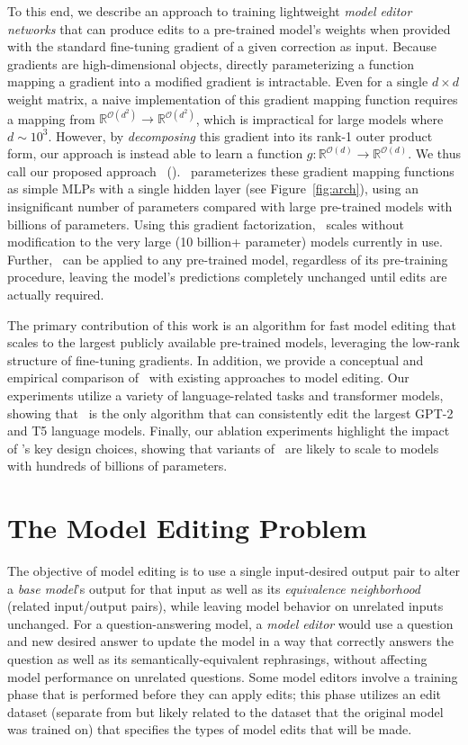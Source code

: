 \documentclass{article}
\begin{document}
To this end, we describe an approach to training lightweight \textit{model editor networks} that can produce edits to a pre-trained model's weights when provided with the standard fine-tuning gradient of a given correction as input. Because gradients are high-dimensional objects, directly parameterizing a function mapping a gradient into a modified gradient is intractable. Even for a single $d \times d$ weight matrix, a naive implementation of this gradient mapping function requires a mapping from $\mathbb{R}^{\mathcal{O}(d^2)} \rightarrow \mathbb{R}^{\mathcal{O}(d^2)}$, which is impractical for large models where $d\sim10^3$. However, by \textit{decomposing} this gradient into its rank-1 outer product form, our approach is instead able to learn a function $g:\mathbb{R}^{\mathcal{O}(d)} \rightarrow \mathbb{R}^{\mathcal{O}(d)}$. We thus call our proposed approach \fullname~(\name). \name~parameterizes these gradient mapping functions as simple MLPs with a single hidden layer (see Figure~\ref{fig:arch}), using an insignificant number of parameters compared with large pre-trained models with billions of parameters. Using this gradient factorization, \name~scales without modification to the very large (10 billion+ parameter) models currently in use. Further, \name~can be applied to any pre-trained model, regardless of its pre-training procedure, leaving the model's predictions completely unchanged until edits are actually required.

The primary contribution of this work is an algorithm for fast model editing that scales to the largest publicly available pre-trained models, leveraging the low-rank structure of fine-tuning gradients. In addition, we provide a conceptual and empirical comparison of \name~with existing approaches to model editing. Our experiments utilize a variety of language-related tasks and transformer models, showing that \name~is the only algorithm that can consistently edit the largest GPT-2 \citep{radford2019language} and T5 \citep{2020t5} language models. Finally, our ablation experiments highlight the impact of \name's key design choices, showing that variants of \name~are likely to scale to models with hundreds of billions of parameters.


\section{The Model Editing Problem}
The objective of model editing is to use a single input-desired output pair to alter a \textit{base model}'s output for that input as well as its \textit{equivalence neighborhood} (related input/output pairs), while leaving model behavior on unrelated inputs unchanged. For a question-answering model, a \textit{model editor} would use a question and new desired answer to update the model in a way that correctly answers the question as well as its semantically-equivalent rephrasings, without affecting model performance on unrelated questions. Some model editors involve a training phase that is performed before they can apply edits; this phase utilizes an edit dataset (separate from but likely related to the dataset that the original model was trained on) that specifies the types of model edits that will be made.
\end{document}
